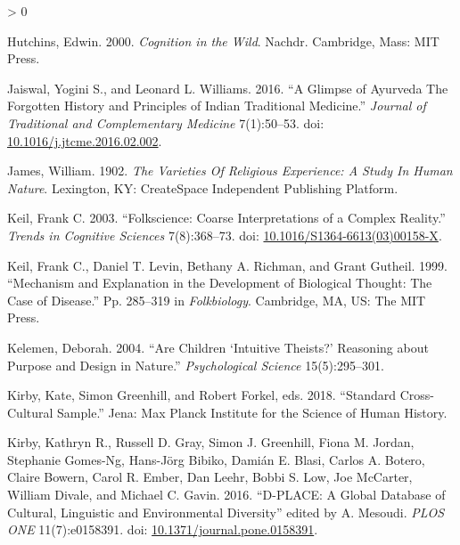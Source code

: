 \documentclass[
  11pt,
]{article}
\newlength{\cslhangindent}
\newenvironment{CSLReferences}[2] %
 {%
  \setlength{\parindent}{0pt}
  \ifodd #1 \everypar{\setlength{\hangindent}{\cslhangindent}}\ignorespaces\fi
  \ifnum #2 > 0
  \setlength{\parskip}{#2\baselineskip}
  \fi
 }%
 {}
\begin{document}
\begin{CSLReferences}{1}{0}
\leavevmode\hypertarget{ref-hutchinsCognitionWild2000}{}%
Hutchins, Edwin. 2000. \emph{Cognition in the Wild}. Nachdr. {Cambridge, Mass}: {MIT Press}.

\leavevmode\hypertarget{ref-jaiswalGlimpseAyurvedaForgotten2016}{}%
Jaiswal, Yogini S., and Leonard L. Williams. 2016. {``A Glimpse of {Ayurveda} {} {The} Forgotten History and Principles of {Indian} Traditional Medicine.''} \emph{Journal of Traditional and Complementary Medicine} 7(1):50--53. doi: \href{https://doi.org/10.1016/j.jtcme.2016.02.002}{10.1016/j.jtcme.2016.02.002}.

\leavevmode\hypertarget{ref-jamesVarietiesReligiousExperience2009}{}%
James, William. 1902. \emph{The {Varieties Of Religious Experience}: {A Study In Human Nature}}. {Lexington, KY}: {CreateSpace Independent Publishing Platform}.

\leavevmode\hypertarget{ref-keilFolkscienceCoarseInterpretations2003}{}%
Keil, Frank C. 2003. {``Folkscience: Coarse Interpretations of a Complex Reality.''} \emph{Trends in Cognitive Sciences} 7(8):368--73. doi: \href{https://doi.org/10.1016/S1364-6613(03)00158-X}{10.1016/S1364-6613(03)00158-X}.

\leavevmode\hypertarget{ref-keilMechanismExplanationDevelopment1999}{}%
Keil, Frank C., Daniel T. Levin, Bethany A. Richman, and Grant Gutheil. 1999. {``Mechanism and Explanation in the Development of Biological Thought: {The} Case of Disease.''} Pp. 285--319 in \emph{Folkbiology}. {Cambridge, MA, US}: {The MIT Press}.

\leavevmode\hypertarget{ref-kelemen2004children}{}%
Kelemen, Deborah. 2004. {``Are Children {`Intuitive Theists?'} {Reasoning} about Purpose and Design in Nature.''} \emph{Psychological Science} 15(5):295--301.

\leavevmode\hypertarget{ref-dplace2_SCCS}{}%
Kirby, Kate, Simon Greenhill, and Robert Forkel, eds. 2018. {``Standard Cross-Cultural Sample.''} Jena: Max Planck Institute for the Science of Human History.

\leavevmode\hypertarget{ref-kirbyDPLACEGlobalDatabase2016}{}%
Kirby, Kathryn R., Russell D. Gray, Simon J. Greenhill, Fiona M. Jordan, Stephanie Gomes-Ng, Hans-Jörg Bibiko, Damián E. Blasi, Carlos A. Botero, Claire Bowern, Carol R. Ember, Dan Leehr, Bobbi S. Low, Joe McCarter, William Divale, and Michael C. Gavin. 2016. {``D-{PLACE}: {A Global Database} of {Cultural}, {Linguistic} and {Environmental Diversity}''} edited by A. Mesoudi. \emph{PLOS ONE} 11(7):e0158391. doi: \href{https://doi.org/10.1371/journal.pone.0158391}{10.1371/journal.pone.0158391}.


\end{CSLReferences}
\end{document}
